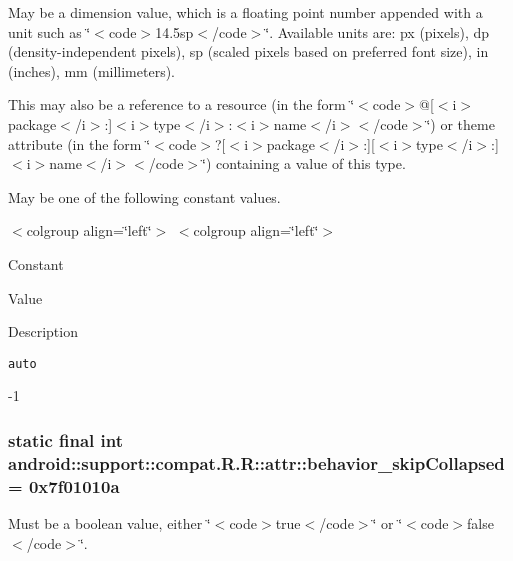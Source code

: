 May be a dimension value, which is a floating point number appended with a unit such as \char`\"{}$<$code$>$14.5sp$<$/code$>$\char`\"{}. Available units are: px (pixels), dp (density-independent pixels), sp (scaled pixels based on preferred font size), in (inches), mm (millimeters). 

This may also be a reference to a resource (in the form \char`\"{}$<$code$>$@\mbox{[}$<$i$>$package$<$/i$>$:\mbox{]}$<$i$>$type$<$/i$>$:$<$i$>$name$<$/i$>$$<$/code$>$\char`\"{}) or theme attribute (in the form \char`\"{}$<$code$>$?\mbox{[}$<$i$>$package$<$/i$>$:\mbox{]}\mbox{[}$<$i$>$type$<$/i$>$:\mbox{]}$<$i$>$name$<$/i$>$$<$/code$>$\char`\"{}) containing a value of this type. 

May be one of the following constant values. \begin{TabularC}{0}
\hline
\end{TabularC}
$<$colgroup align=\char`\"{}left\char`\"{}$>$ $<$colgroup align=\char`\"{}left\char`\"{}$>$ 

Constant

Value

Description 

{\tt auto}

-1\hypertarget{classandroid_1_1support_1_1compat_1_1_r_1_1attr_97aa4d85f290769461e24f9ecb031d47}{
\subsubsection[{behavior\_\-skipCollapsed}]{\setlength{\rightskip}{0pt plus 5cm}static final int android::support::compat.R.R::attr::behavior\_\-skipCollapsed = 0x7f01010a}}
\label{classandroid_1_1support_1_1compat_1_1_r_1_1attr_97aa4d85f290769461e24f9ecb031d47}


Must be a boolean value, either \char`\"{}$<$code$>$true$<$/code$>$\char`\"{} or \char`\"{}$<$code$>$false$<$/code$>$\char`\"{}. 

